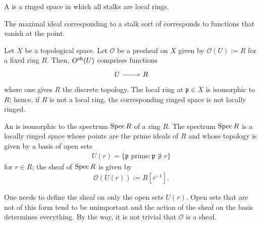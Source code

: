 \documentclass [11 pt, oneside] {article}
\begin{document}
\begin{definition}[ ]\label{}\text{}
A  is a ringed space in which all stalks are local rings.
\end{definition}

\begin{remark}
	The maximal ideal corresponding to a stalk sort of corresponds to functions that vanish at the point.
\end{remark}

\begin{example}\label{}\text{}
Let $X$ be a topological space. Let $\mathscr{O}$ be a presheaf on $X$ given by $\mathscr{O}(U) := R$ for a fixed ring $R$. Then, $\relax{O}^{\textup {sh}}(U)$ comprises functions 
\[
\begin{tikzcd}
U\ar[r]&R
\end{tikzcd}
\]
where one gives $R$ the discrete topology. The local ring at $\mathfrak{p}\in X$ is isomorphic to $R$; hence, if $R$ is not a local ring, the corresponding ringed space is not locally ringed. 
\end{example}

\begin{definition}[ ]\label{}\text{}
An  is isomorphic to the spectrum $\operatorname{Spec} R$ of a ring $R$. The spectrum $\operatorname{Spec} R$ is a locally ringed space whose points are the prime ideals of $R$ and whose topology is given by a basis of open sets
\begin{align*}
	U(r) = \{\mathfrak{p} \textrm{ prime}: \mathfrak{p}\not\ni r\}
\end{align*}
for $r\in R$; the sheaf of $\operatorname{Spec} R$ is given by
\begin{align*}
	\mathscr{O}(U(r)) := R[r ^{-1}].
\end{align*}
\end{definition}

\begin{remark}
	One needs to define the sheaf on only the open sets $U(r)$. Open sets that are not of this form tend to be unimportant and the action of the sheaf on the basis determines everything. By the way, it is not trivial that $\mathscr{O}$ is a sheaf.
\end{remark}
\end{document}
